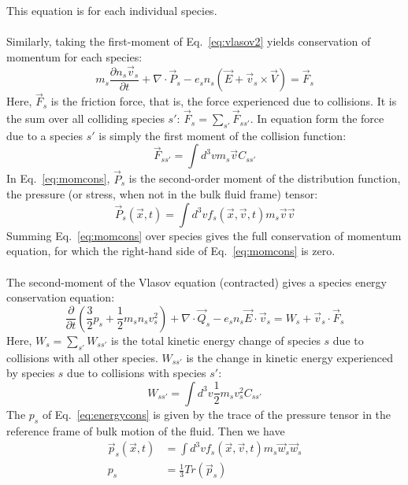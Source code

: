 This equation is for each individual species. \\
\\
Similarly, taking the first-moment of Eq.~\ref{eq:vlasov2} yields conservation of momentum for each species:
\begin{equation}
  m_s\frac{\partial n_s\vec v_s}{\partial t}+\nabla\cdot\vec P_s-e_sn_s(\vec E+\vec v_s\times\vec V)=\vec F_s \label{eq:momcons}
\end{equation}
Here, $\vec F_s$ is the friction force, that is, the force experienced due to collisions. It is the sum over all colliding species $s'$: $\vec F_{s}=\sum_{s'}\vec F_{ss'}$. In equation form the force due to a species $s'$ is simply the first moment of the collision function:
\begin{equation}
  \vec F_{ss'}=\int d^3vm_s\vec vC_{ss'}
\end{equation}
In Eq.~\ref{eq:momcons}, $\vec P_s$ is the second-order moment of the distribution function, the pressure (or stress, when not in the bulk fluid frame) tensor:
\begin{equation}
  \vec P_s(\vec x,t)=\int d^3vf_s(\vec x,\vec v,t)m_s\vec v\vec v
\end{equation}
Summing Eq.~\ref{eq:momcons} over species gives the full conservation of momentum equation, for which the right-hand side of Eq.~\ref{eq:momcons} is zero.\\
\\
The second-moment of the Vlasov equation (contracted) gives a species energy conservation equation:
\begin{equation}
  \frac{\partial}{\partial t}\left(\frac32p_s+\frac12m_sn_sv_s^2\right)+\nabla\cdot\vec Q_s-e_sn_s\vec E\cdot\vec v_s=W_s+\vec v_s\cdot \vec F_s \label{eq:energycons}
\end{equation}
Here, $W_s=\sum_{s'}W_{ss'}$ is the total kinetic energy change of species $s$ due to collisions with all other species. $W_{ss'}$ is the change in kinetic energy experienced by species $s$ due to collisions with species $s'$:
\begin{equation}
  W_{ss'}=\int d^3v\frac12m_sv_s^2C_{ss'}
\end{equation}
The $p_s$ of Eq.~\ref{eq:energycons} is given by the trace of the pressure tensor in the reference frame of bulk motion of the fluid. Then we have
\begin{align}
  \vec p_s(\vec x,t)&=\int d^3vf_s(\vec x,\vec v,t)m_s\vec w_s\vec w_s\\
  p_s&=\frac13Tr(\vec p_s)
\end{align}
